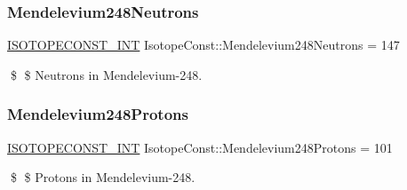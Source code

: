 \subsubsection{\texorpdfstring{Mendelevium248\+Neutrons}{Mendelevium248Neutrons}}
{\footnotesize\ttfamily \mbox{\hyperlink{group___isotope_const-_macros_ga5f18360b3e99483a35c32d789e62621c}{I\+S\+O\+T\+O\+P\+E\+C\+O\+N\+S\+T\+\_\+\+I\+NT}} Isotope\+Const\+::\+Mendelevium248\+Neutrons = 147}

\$ \$ Neutrons in Mendelevium-\/248. \mbox{\label{group___isotope_const-_mendelevium-_md248_ga50c4d1db7246bdc1b327ef8feddfd128}} 
\subsubsection{\texorpdfstring{Mendelevium248\+Protons}{Mendelevium248Protons}}
{\footnotesize\ttfamily \mbox{\hyperlink{group___isotope_const-_macros_ga5f18360b3e99483a35c32d789e62621c}{I\+S\+O\+T\+O\+P\+E\+C\+O\+N\+S\+T\+\_\+\+I\+NT}} Isotope\+Const\+::\+Mendelevium248\+Protons = 101}

\$ \$ Protons in Mendelevium-\/248. 